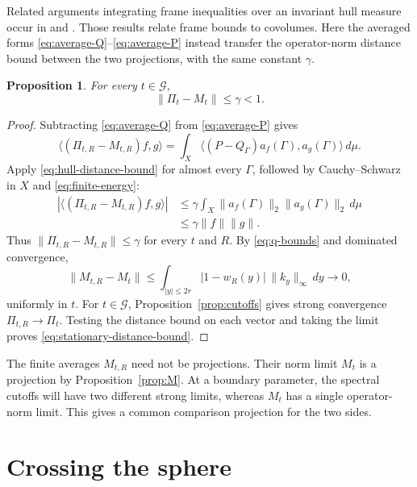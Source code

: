 \documentclass[a4paper,12pt,reqno]{amsart}
\newtheorem{proposition}[theorem]{Proposition}
\theoremstyle{remark}
\numberwithin{equation}{section}
\begin{document}
Related arguments integrating frame inequalities over an invariant hull
measure occur in \cite[Theorem~3.12]{EnstadRaum} and
\cite[Theorem~3.5]{EnstadVanVelthoven}. Those results relate frame
bounds to covolumes. Here the averaged forms
\eqref{eq:average-Q}--\eqref{eq:average-P} instead transfer the
operator-norm distance bound between the two projections, with the same
constant $\gamma$.

\begin{proposition}\label{prop:distance}
For every $t\in\mathcal G$,
\begin{equation}\label{eq:stationary-distance-bound}
 \|\Pi_t-M_t\|\leq\gamma<1.
\end{equation}
\end{proposition}

\begin{proof}
Subtracting \eqref{eq:average-Q} from \eqref{eq:average-P} gives
\begin{equation}\label{eq:compression-identity}
 \langle(\Pi_{t,R}-M_{t,R})f,g\rangle
 =\int_X\langle(P-Q_\Gamma)a_f(\Gamma),a_g(\Gamma)\rangle\,d\mu.
\end{equation}
Apply \eqref{eq:hull-distance-bound} for almost every $\Gamma$, followed
by Cauchy--Schwarz in $X$ and \eqref{eq:finite-energy}:
\begin{align*}
 |\langle(\Pi_{t,R}-M_{t,R})f,g\rangle|
 &\leq\gamma\int_X\|a_f(\Gamma)\|_2\|a_g(\Gamma)\|_2\,d\mu\\
 &\leq\gamma\|f\|\|g\|.
\end{align*}
Thus $\|\Pi_{t,R}-M_{t,R}\|\leq\gamma$ for every $t$ and $R$.
By \eqref{eq:q-bounds} and dominated convergence,
\begin{equation}\label{eq:M-norm-limit}
 \|M_{t,R}-M_t\|
 \leq\int_{|y|\leq2r}|1-w_R(y)|\,\|k_y\|_\infty\,dy
 \longrightarrow0,
\end{equation}
uniformly in $t$. For $t\in\mathcal G$, Proposition~\ref{prop:cutoffs}
gives strong convergence $\Pi_{t,R}\to\Pi_t$. Testing the distance
bound on each vector and taking the limit proves
\eqref{eq:stationary-distance-bound}.
\end{proof}

The finite averages $M_{t,R}$ need not be projections. Their norm limit
$M_t$ is a projection by Proposition~\ref{prop:M}. At a boundary parameter,
the spectral cutoffs will have two different strong limits, whereas
$M_t$ has a single operator-norm limit. This gives a common comparison
projection for the two sides.

\section{Crossing the sphere}\label{sec:sphere}
\end{document}
